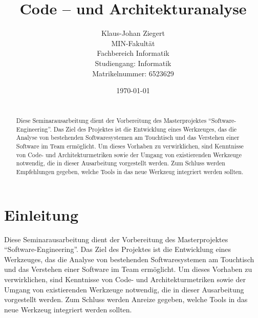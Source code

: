 \documentclass[12pt]{article}
\title{Code -- und Architekturanalyse}
\author{
        Klaus-Johan Ziegert\\
        MIN-Fakultät\\
        Fachbereich Informatik\\
        Studiengang: Informatik\\
        Matrikelnummer: 6523629\\
}
\date{\today}
\begin{document}
\maketitle
\begin{abstract}
        ~\\
        Diese Seminarausarbeitung dient der Vorbereitung des
        Masterprojektes ``Software-Engineering''. Das Ziel des
        Projektes ist die Entwicklung eines Werkzeuges, das die
        Analyse von bestehenden Softwaresystemen am Touchtisch
        und das Verstehen einer Software im Team ermöglicht. Um
        dieses Vorhaben zu verwirklichen, sind Kenntnisse von
        Code- und Architekturmetriken sowie der Umgang von
        existierenden Werkzeuge notwendig, die in dieser
        Ausarbeitung vorgestellt werden.  Zum Schluss werden
        Empfehlungen gegeben, welche Tools in das neue Werkzeug
        integriert werden sollten.
\end{abstract}

\newpage

\tableofcontents

\newpage

\section{Einleitung}
Diese Seminarausarbeitung dient der Vorbereitung des
Masterprojektes ``Software-Engineering''. Das Ziel des Projektes
ist die Entwicklung eines Werkzeuges, das die Analyse von
bestehenden Softwaresystemen am Touchtisch und das Verstehen
einer Software im Team ermöglicht. Um dieses Vorhaben zu
verwirklichen, sind Kenntnisse von Code- und Architekturmetriken
sowie der Umgang von existierenden Werkzeuge notwendig, die in
dieser Ausarbeitung vorgestellt werden.  Zum Schluss werden
Anreize gegeben, welche Tools in das neue Werkzeug integriert
werden sollten.

\end{document}

